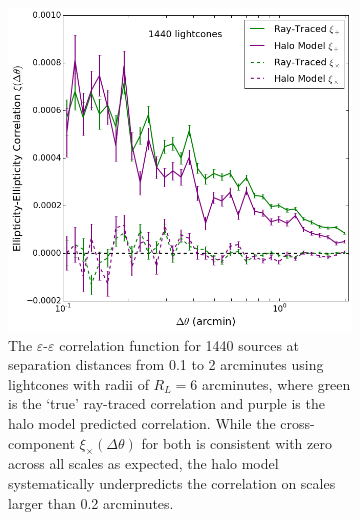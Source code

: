 \documentclass[%
 reprint,
 amsmath,amssymb,
 aps,nofootinbib
]{revtex4-1}
\begin{document}
\begin{figure}
    \centering
    \begin{subfigure}{0.475\textwidth}
        \includegraphics[width=\textwidth]{figs-swe/thesis/gg_corr.png}
        \captionsetup{justification=raggedright,singlelinecheck=false}
        \caption{The $\varepsilon$-$\varepsilon$ correlation function for 1440 sources at separation distances from 0.1 to 2 arcminutes using lightcones with radii of $R_L=6$ arcminutes, where green is the `true' ray-traced correlation and purple is the halo model predicted correlation. While the cross-component $\xi_\times(\Delta\theta)$ for both is consistent with zero across all scales as expected, the halo model systematically underpredicts the correlation on scales larger than 0.2 arcminutes.}
        \label{fig:gg_corr}
    \end{subfigure}
    ~~
    \begin{subfigure}{0.475\textwidth}

\end{subfigure}
\end{figure}
\end{document}
